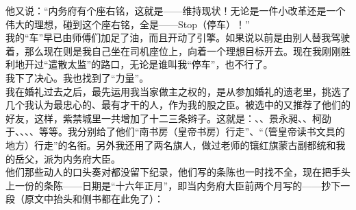 他又说：“内务府有个座右铭，这就是——维持现状！无论是一件小改革还是一个伟大的理想，碰到这个座右铭，全是——Stop（停车）！”\\

我的“车”早已由师傅们加足了油，而且开动了引擎。如果说以前是由别人替我驾驶着，那么现在则是我自己坐在司机座位上，向着一个理想目标开去。现在我刚刚胜利地开过“遣散太监”的路口，无论是谁叫我“停车”，也不行了。\\

我下了决心。我也找到了“力量”。\\

我在婚礼过去之后，最先运用我当家做主之权的，是从参加婚礼的遗老里，挑选了几个我认为最忠心的、最有才干的人，作为我的股之臣。被选中的又推荐了他们的好友，这样，紫禁城里一共增加了十二三条辫子。这就是：、、景永昶、、柯劭于、、、、等等。我分别给了他们“南书房（皇帝书房）行走”、“（管皇帝读书文具的地方）行走”的名衔。另外我还用了两名旗人，做过老师的镶红旗蒙古副都统和我的岳父，派为内务府大臣。\\

他们那些动人的口头奏对都没留下纪录，他们写的条陈也一时找不全，现在把手头上一份的条陈——日期是“十六年正月”，即当内务府大臣前两个月写的——抄下一段（原文中抬头和侧书都在此免了）：\\

